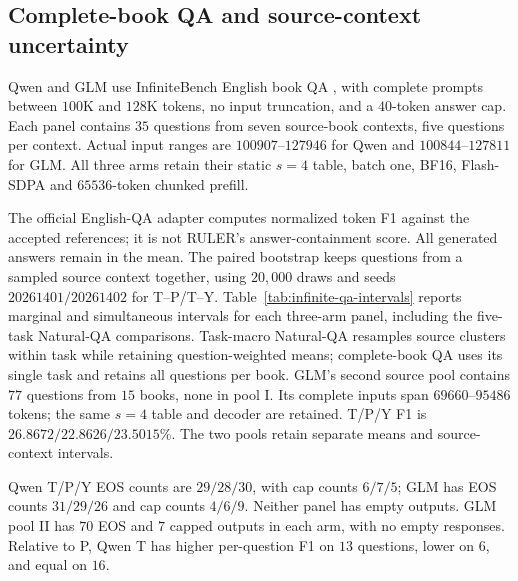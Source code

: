 \subsection{Complete-book QA and source-context uncertainty}
\label{sec:infinite-qa-new}
Qwen and GLM use InfiniteBench English book QA \citep{zhang2024infinitebench},
with complete prompts between $100$K and $128$K tokens, no input truncation,
and a $40$-token answer cap. Each panel contains $35$ questions from seven
source-book contexts, five questions per context. Actual input ranges are
$100907$--$127946$ for Qwen and $100844$--$127811$ for GLM.
All three arms retain their static $s=4$ table, batch one, BF16,
Flash-SDPA and $65536$-token chunked prefill.

The official English-QA adapter computes normalized token F1 against the
accepted references; it is not RULER's answer-containment score. All generated
answers remain in the mean. The paired bootstrap keeps questions from a
sampled source context together, using $20{,}000$ draws and seeds
$20261401/20261402$ for T--P/T--Y. Table~\ref{tab:infinite-qa-intervals}
reports marginal and simultaneous intervals for each three-arm panel,
including the five-task Natural-QA comparisons. Task-macro Natural-QA
resamples source clusters within task while retaining question-weighted means;
complete-book QA uses its single task and retains all questions per book. 
GLM's second source pool contains $77$ questions from $15$ books, none in
pool I. Its complete inputs span $69660$--$95486$ tokens; the same $s=4$
table and decoder are retained. T/P/Y F1 is $26.8672/22.8626/23.5015\%$.
The two pools retain separate means and source-context intervals.


Qwen T/P/Y EOS counts are $29/28/30$, with cap counts $6/7/5$;
GLM has EOS counts $31/29/26$ and cap counts $4/6/9$. Neither panel has
empty outputs. GLM pool II has $70$ EOS and $7$ capped outputs in each arm,
with no empty responses. Relative to P, Qwen T has higher per-question F1 on $13$
questions, lower on $6$, and equal on $16$. 
\FloatBarrier

